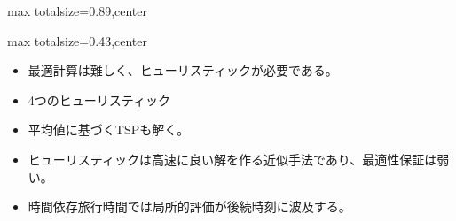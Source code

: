\begin{minipage}[t]{0.58\textwidth}
\begin{adjustbox}{max totalsize={\textwidth}{0.89\textheight},center}
\begin{minipage}{\textwidth}
\end{minipage}
\end{adjustbox}
\end{minipage}


\clearpage
{}
\begin{minipage}[t]{0.405\textwidth}
\begin{adjustbox}{max totalsize={\textwidth}{0.43\textheight},center}
\begin{minipage}{\textwidth}\scriptsize
{}\begin{itemize}
\item 最適計算は難しく、ヒューリスティックが必要である。
\item 4つのヒューリスティック
\item 平均値に基づくTSPも解く。
\end{itemize}\begin{itemize}
\item ヒューリスティックは高速に良い解を作る近似手法であり、最適性保証は弱い。
\item 時間依存旅行時間では局所的評価が後続時刻に波及する。
\end{itemize}
\end{minipage}
\end{adjustbox}
\end{minipage}\hfill
